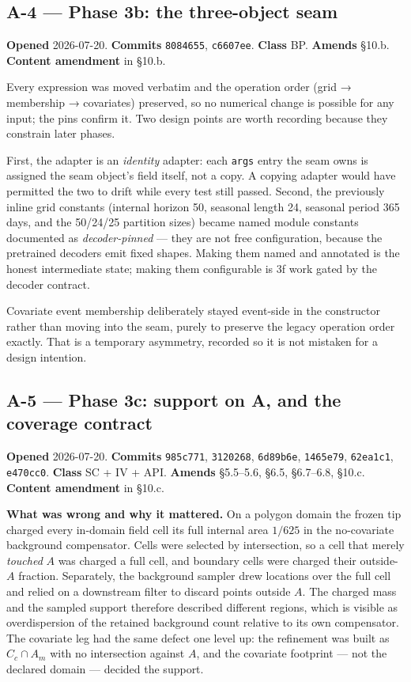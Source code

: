 \documentclass[
  10pt,
]{article}
\begin{document}
\hypertarget{a-4}{%
\subsection{A-4 --- Phase 3b: the three-object seam}\label{a-4}}

\textbf{Opened} 2026-07-20. \textbf{Commits} \texttt{8084655}, \texttt{c6607ee}. \textbf{Class} BP. \textbf{Amends} §10.b. \textbf{Content amendment} in §10.b.

Every expression was moved verbatim and the operation order (grid → membership → covariates) preserved, so no numerical change is possible for any input; the pins confirm it. Two design points are worth recording because they constrain later phases.

First, the adapter is an \emph{identity} adapter: each \texttt{args} entry the seam owns is assigned the seam object's field itself, not a copy. A copying adapter would have permitted the two to drift while every test still passed. Second, the previously inline grid constants (internal horizon 50, seasonal length 24, seasonal period 365 days, and the 50/24/25 partition sizes) became named module constants documented as \emph{decoder-pinned} --- they are not free configuration, because the pretrained decoders emit fixed shapes. Making them named and annotated is the honest intermediate state; making them configurable is 3f work gated by the decoder contract.

Covariate event membership deliberately stayed event-side in the constructor rather than moving into the seam, purely to preserve the legacy operation order exactly. That is a temporary asymmetry, recorded so it is not mistaken for a design intention.

\hypertarget{a-5}{%
\subsection{A-5 --- Phase 3c: support on A, and the coverage contract}\label{a-5}}

\textbf{Opened} 2026-07-20. \textbf{Commits} \texttt{985c771}, \texttt{3120268}, \texttt{6d89b6e}, \texttt{1465e79}, \texttt{62ea1c1}, \texttt{e470cc0}. \textbf{Class} SC + IV + API. \textbf{Amends} §5.5--5.6, §6.5, §6.7--6.8, §10.c. \textbf{Content amendment} in §10.c.

\textbf{What was wrong and why it mattered.} On a polygon domain the frozen tip charged every in-domain field cell its full internal area \(1/625\) in the no-covariate background compensator. Cells were selected by intersection, so a cell that merely \emph{touched} \(A\) was charged a full cell, and boundary cells were charged their outside-\(A\) fraction. Separately, the background sampler drew locations over the full cell and relied on a downstream filter to discard points outside \(A\). The charged mass and the sampled support therefore described different regions, which is visible as overdispersion of the retained background count relative to its own compensator. The covariate leg had the same defect one level up: the refinement was built as \(C_c \cap A_m\) with no intersection against \(A\), and the covariate footprint --- not the declared domain --- decided the support.
\end{document}
